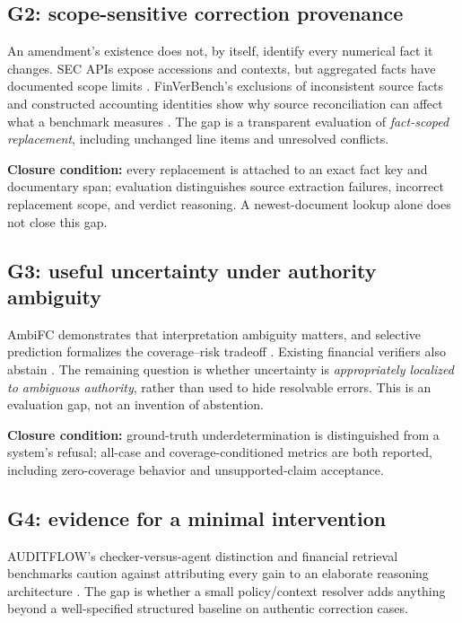 \documentclass[11pt,a4paper]{article}
\newcommand{\lead}[1]{\textbf{\color{navy}#1}}
\begin{document}
\subsection{G2: scope-sensitive correction provenance}
An amendment's existence does not, by itself, identify every numerical fact it changes. SEC APIs expose accessions and contexts, but aggregated facts have documented scope limits \cite{sec}. FinVerBench's exclusions of inconsistent source facts and constructed accounting identities show why source reconciliation can affect what a benchmark measures \cite{finverbench}. The gap is a transparent evaluation of \emph{fact-scoped replacement}, including unchanged line items and unresolved conflicts.

\lead{Closure condition:} every replacement is attached to an exact fact key and documentary span; evaluation distinguishes source extraction failures, incorrect replacement scope, and verdict reasoning. A newest-document lookup alone does not close this gap.

\subsection{G3: useful uncertainty under authority ambiguity}
AmbiFC demonstrates that interpretation ambiguity matters, and selective prediction formalizes the coverage--risk tradeoff \cite{ambifc,selective}. Existing financial verifiers also abstain \cite{verifin,finground}. The remaining question is whether uncertainty is \emph{appropriately localized to ambiguous authority}, rather than used to hide resolvable errors. This is an evaluation gap, not an invention of abstention.

\lead{Closure condition:} ground-truth underdetermination is distinguished from a system's refusal; all-case and coverage-conditioned metrics are both reported, including zero-coverage behavior and unsupported-claim acceptance.

\subsection{G4: evidence for a minimal intervention}
AUDITFLOW's checker-versus-agent distinction and financial retrieval benchmarks caution against attributing every gain to an elaborate reasoning architecture \cite{auditflow,t2ragbench,finmragbench}. The gap is whether a small policy/context resolver adds anything beyond a well-specified structured baseline on authentic correction cases.
\end{document}
